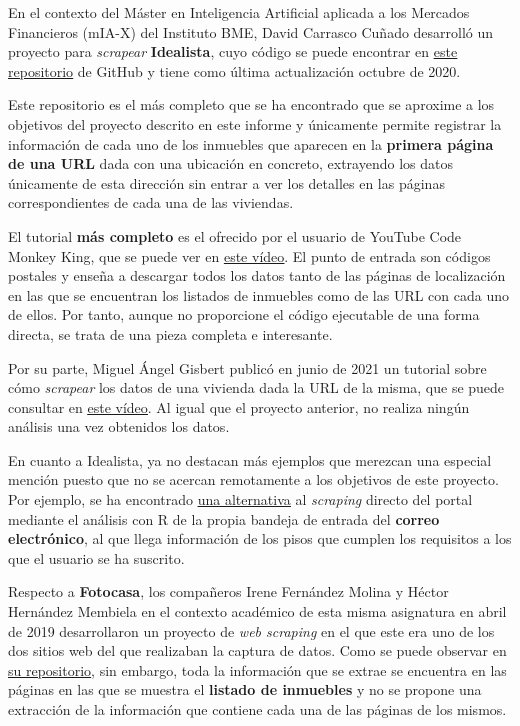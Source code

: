 \documentclass[12pt]{article}
\begin{document}
En el contexto del Máster en Inteligencia Artificial aplicada a los Mercados Financieros (mIA-X) del Instituto BME, David Carrasco Cuñado desarrolló un proyecto para \textit{scrapear} \textbf{Idealista}, cuyo código se puede encontrar en \href{https://github.com/David-Carrasco/Scrapy-Idealista}{\underline{este repositorio}} de GitHub y tiene como última actualización octubre de 2020. 

Este repositorio es el más completo que se ha encontrado que se aproxime a los objetivos del proyecto descrito en este informe y únicamente permite registrar la información de cada uno de los inmuebles que aparecen en la \textbf{primera página de una URL} dada con una ubicación en concreto, extrayendo los datos únicamente de esta dirección sin entrar a ver los detalles en las páginas correspondientes de cada una de las viviendas. 

El tutorial \textbf{más completo} es el ofrecido por el usuario de YouTube Code Monkey King, que se puede ver en \href{https://www.youtube.com/watch?v=4Tv73KuqgVo}{\underline{este vídeo}}. El punto de entrada son códigos postales y enseña a descargar todos los datos tanto de las páginas de localización en las que se encuentran los listados de inmuebles como de las URL con cada uno de ellos. Por tanto, aunque no proporcione el código ejecutable de una forma directa, se trata de una pieza completa e interesante. 

Por su parte, Miguel Ángel Gisbert publicó en junio de 2021 un tutorial sobre cómo \textit{scrapear} los datos de una vivienda dada la URL de la misma, que se puede consultar en \href{https://www.youtube.com/watch?v=2UyJv5oe570}{\underline{este vídeo}}. Al igual que el proyecto anterior, no realiza ningún análisis una vez obtenidos los datos. 

En cuanto a Idealista, ya no destacan más ejemplos que merezcan una especial mención puesto que no se acercan remotamente a los objetivos de este proyecto. Por ejemplo, se ha encontrado \href{https://medium.com/@rubenmarcos/crear-una-base-de-datos-de-la-evoluci%C3%B3n-del-mercado-inmobiliario-con-idealista-y-r-y-sin-scraping-1d5025a9d47e}{\underline{una alternativa}} al \textit{scraping} directo del portal mediante el análisis con R de la propia bandeja de entrada del \textbf{correo electrónico}, al que llega información de los pisos que cumplen los requisitos a los que el usuario se ha suscrito.

Respecto a \textbf{Fotocasa}, los compañeros Irene Fernández Molina y Héctor Hernández Membiela en el contexto académico de esta misma asignatura en abril de 2019 desarrollaron un proyecto de \textit{web scraping} en el que este era uno de los dos sitios web del que realizaban la captura de datos. Como se puede observar en \href{https://github.com/EdelBlau/PEC_TPC}{\underline{su repositorio}}, sin embargo, toda la información que se extrae se encuentra en las páginas en las que se muestra el \textbf{listado de inmuebles} y no se propone una extracción de la información que contiene cada una de las páginas de los mismos. 
\end{document}
